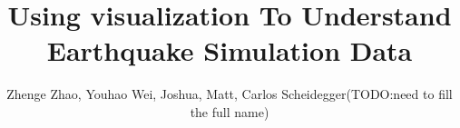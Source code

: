 \documentclass[journal]{vgtc}                %
\title{Using visualization To Understand  Earthquake Simulation Data}
\author{Zhenge Zhao, Youhao Wei, Joshua, Matt, Carlos Scheidegger(TODO:need to fill the full name)}
\begin{document}



\label{sec:myintro}
\maketitle



%





%

%



%


\end{document}
